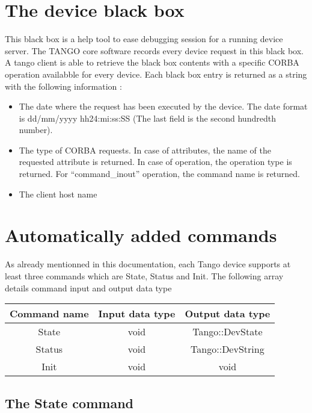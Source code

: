 \section{The device black box}

This black box is a help tool to ease debugging
session for a running device server. The TANGO core software records
every device request in this black box. A tango client is able to
retrieve the black box contents with a specific CORBA
operation availabble for every device. Each black box entry is returned
as a string with the following information :
\begin{itemize}
\item The date where the request has been executed by the device. The date
format is dd/mm/yyyy hh24:mi:ss:SS (The last field is the second hundredth
number).
\item The type of CORBA requests. In case of attributes, the name of the
requested attribute is returned. In case of operation, the operation
type is returned. For ``command\_inout'' operation, the command
name is returned.
\item The client host name
\end{itemize}

\section{Automatically added commands}

As already mentionned in this documentation, each Tango device supports
at least three commands which are State, Status
and Init. The following array details command input and
output data type

\vspace{0.3cm}

\begin{center}
\begin{longtable}{|c|c|c|}
\hline 
Command name & Input data type & Output data type\tabularnewline
\hline 
\hline 
State & void & Tango::DevState\tabularnewline
\hline 
Status & void & Tango::DevString\tabularnewline
\hline 
Init & void & void\tabularnewline
\hline 
\end{longtable}
\par\end{center}

\vspace{0.3cm}


\subsection{The State command}

